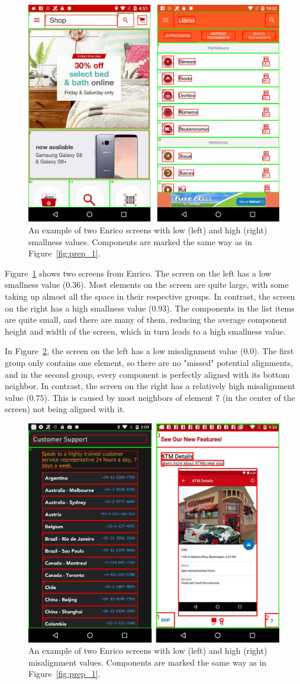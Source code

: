 \documentclass[11pt,titlepage,oneside,openany]{book}
\begin{document}
\begin{figure}[H]
	\centering
	\includegraphics[width=.7\textwidth]{figures/smallness.png}
	\caption{An example of two Enrico screens with low (left) and high (right) smallness values. Components are marked the same way as in Figure~\ref{fig:prep_1}.}
	\label{fig:small_ex}
\end{figure}

Figure~\ref{fig:small_ex} shows two screens from Enrico. The screen on the left has a low smallness value ($0.36$). Most elements on the screen are quite large, with some taking up almost all the space in their respective groups. In contrast, the screen on the right has a high smallness value ($0.93$). The components in the list items are quite small, and there are many of them, reducing the average component height and width of the screen, which in turn leads to a high smallness value.

In Figure~\ref{fig:mis_ex}, the screen on the left has a low misalignment value ($0.0$). The first group only contains one element, so there are no "missed" potential alignments, and in the second group, every component is perfectly aligned with its bottom neighbor. In contrast, the screen on the right has a relatively high misalignment value ($0.75$). This is caused by most neighbors of element 7 (in the center of the screen) not being aligned with it. 

\begin{figure}[H]
	\centering
	\includegraphics[width=.7\textwidth]{figures/misalignment.png}
	\caption{An example of two Enrico screens with low (left) and high (right) misalignment values. Components are marked the same way as in Figure~\ref{fig:prep_1}.}
	\label{fig:mis_ex}
\end{figure}
\end{document}
